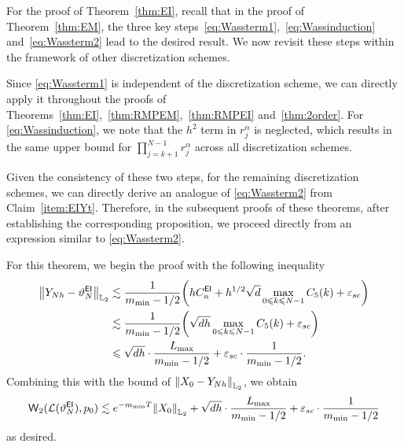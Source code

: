 For the proof of Theorem~\ref{thm:EI}, recall that in the proof of Theorem~\ref{thm:EM}, the three key steps~\eqref{eq:Wassterm1},~\eqref{eq:Wassinduction} and~\eqref{eq:Wassterm2} lead to the desired result. 
We now revisit these steps within the framework of other discretization schemes.

Since \eqref{eq:Wassterm1} is independent of the discretization scheme, we can directly apply it throughout the proofs of Theorems~\ref{thm:EI},~\ref{thm:RMPEM},~\ref{thm:RMPEI} and~\ref{thm:2order}. 
For \eqref{eq:Wassinduction}, we note that the $h^2$ term in $r_j^{\alpha}$ is neglected, which results in the same upper bound for $\prod_{j=k+1}^{N-1}r_j^{\alpha}$ across all discretization schemes.


Given the consistency of these two steps, for the remaining discretization schemes, we can directly derive an analogue of \eqref{eq:Wassterm2} from Claim~\ref{item:EIYt}. Therefore, in the subsequent proofs of these theorems, after establishing the corresponding proposition, we proceed directly from an expression similar to \eqref{eq:Wassterm2}.


For this theorem, we begin the proof with the following inequality
\begin{align*}
    \l|Y_{Nh}-\vartheta_N^{\sf EI}\r|_{\Ltwo}
    &\lesssim \dfrac{1}{m_{\min}-1/2}\left(hC_n^{\sf EI}+h^{1/2}\sqrt{d}\max_{0\leqslant k\leqslant N-1}C_5(k)+\varepsilon_{sc}\right)\\
    &\lesssim \dfrac{1}{m_{\min}-1/2}\left(\sqrt{dh}\max_{0\leqslant k\leqslant N-1}C_5(k)+\varepsilon_{sc}\right)\\
    &\leqslant \sqrt{dh}\cdot\dfrac{L_{\max}}{m_{\min}-1/2}+\varepsilon_{sc}\cdot\dfrac{1}{m_{\min}-1/2}.
\end{align*}
Combining this with the bound of $\l|X_0-Y_{Nh}\r|_{\Ltwo}$, we obtain
\begin{align*}
    \wass_2(\law(\vartheta_N^{\sf EI}),p_0)\lesssim e^{-m_{\min}T}\l|X_0\r|_{\Ltwo}+\sqrt{dh}\cdot\dfrac{L_{\max}}{m_{\min}-1/2}+\varepsilon_{sc}\cdot\dfrac{1}{m_{\min}-1/2}
\end{align*}
as desired.

